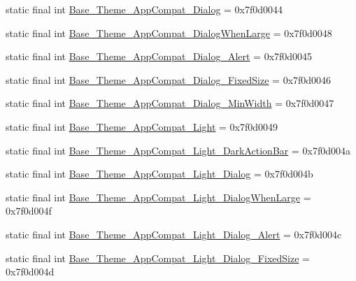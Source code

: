 \begin{DoxyCompactItemize}
\item 
static final int \mbox{\hyperlink{classcom_1_1google_1_1android_1_1gms_1_1R_1_1style_a057e56ee024c2fb08051becccab48529}{Base\+\_\+\+Theme\+\_\+\+App\+Compat\+\_\+\+Dialog}} = 0x7f0d0044
\item 
static final int \mbox{\hyperlink{classcom_1_1google_1_1android_1_1gms_1_1R_1_1style_a17a3789cac50a5cd1b5eb613a7cf9d03}{Base\+\_\+\+Theme\+\_\+\+App\+Compat\+\_\+\+Dialog\+When\+Large}} = 0x7f0d0048
\item 
static final int \mbox{\hyperlink{classcom_1_1google_1_1android_1_1gms_1_1R_1_1style_a57b4699bfd0062fc373cb5cd21a59c6e}{Base\+\_\+\+Theme\+\_\+\+App\+Compat\+\_\+\+Dialog\+\_\+\+Alert}} = 0x7f0d0045
\item 
static final int \mbox{\hyperlink{classcom_1_1google_1_1android_1_1gms_1_1R_1_1style_aa45e8b5e58c90c777a1c633fa2b910a8}{Base\+\_\+\+Theme\+\_\+\+App\+Compat\+\_\+\+Dialog\+\_\+\+Fixed\+Size}} = 0x7f0d0046
\item 
static final int \mbox{\hyperlink{classcom_1_1google_1_1android_1_1gms_1_1R_1_1style_a68ff2d7ac960c19b1eee5b79dbad7172}{Base\+\_\+\+Theme\+\_\+\+App\+Compat\+\_\+\+Dialog\+\_\+\+Min\+Width}} = 0x7f0d0047
\item 
static final int \mbox{\hyperlink{classcom_1_1google_1_1android_1_1gms_1_1R_1_1style_acbdb29e6dae1d6dddf819686502fc364}{Base\+\_\+\+Theme\+\_\+\+App\+Compat\+\_\+\+Light}} = 0x7f0d0049
\item 
static final int \mbox{\hyperlink{classcom_1_1google_1_1android_1_1gms_1_1R_1_1style_a5874d59e8ed51800f149416083639a38}{Base\+\_\+\+Theme\+\_\+\+App\+Compat\+\_\+\+Light\+\_\+\+Dark\+Action\+Bar}} = 0x7f0d004a
\item 
static final int \mbox{\hyperlink{classcom_1_1google_1_1android_1_1gms_1_1R_1_1style_a0c72abe0a405c8de9372287287587710}{Base\+\_\+\+Theme\+\_\+\+App\+Compat\+\_\+\+Light\+\_\+\+Dialog}} = 0x7f0d004b
\item 
static final int \mbox{\hyperlink{classcom_1_1google_1_1android_1_1gms_1_1R_1_1style_a341f18e4b6b5b1aebad6033a127c51f9}{Base\+\_\+\+Theme\+\_\+\+App\+Compat\+\_\+\+Light\+\_\+\+Dialog\+When\+Large}} = 0x7f0d004f
\item 
static final int \mbox{\hyperlink{classcom_1_1google_1_1android_1_1gms_1_1R_1_1style_a8d231970e91f27d8a59630647a6ed69f}{Base\+\_\+\+Theme\+\_\+\+App\+Compat\+\_\+\+Light\+\_\+\+Dialog\+\_\+\+Alert}} = 0x7f0d004c
\item 
static final int \mbox{\hyperlink{classcom_1_1google_1_1android_1_1gms_1_1R_1_1style_add44db70e53e4f6fae5d0651e932fc74}{Base\+\_\+\+Theme\+\_\+\+App\+Compat\+\_\+\+Light\+\_\+\+Dialog\+\_\+\+Fixed\+Size}} = 0x7f0d004d

\end{DoxyCompactItemize}
